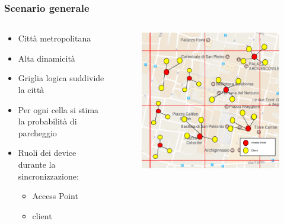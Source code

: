 \documentclass{beamer}
\begin{document}
\begin{frame}
  \frametitle{Scenario generale}
  \begin{columns}
    \begin{column}{0.6\textwidth}
      \begin{itemize}
	\item Città metropolitana
	\item Alta dinamicità
	\item Griglia logica suddivide la città
	\item Per ogni cella si stima la probabilità di parcheggio
	\item Ruoli dei device durante la sincronizzazione:
	\begin{itemize}
	  \item Access Point
	  \item client
	\end{itemize}
      \end{itemize}
    \end{column}

    \begin{column}{0.4\textwidth}
      \begin{figure}
	\raggedleft
	\includegraphics[width=\columnwidth]{img/arch_general.png}
      \end{figure}
    \end{column}
  \end{columns}
\end{frame}
\end{document}
